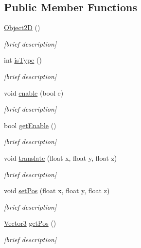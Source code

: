 \subsection*{Public Member Functions}
\begin{DoxyCompactItemize}
\item 
\hyperlink{class_object2_d_adf886706d2a5aac31e1fbe0d71e8dc82}{Object2\-D} ()
\begin{DoxyCompactList}\small\item\em \mbox{[}brief description\mbox{]} \end{DoxyCompactList}\item 
int \hyperlink{class_object2_d_abeb56d59b3bd118d9ba5f098bae0c763}{is\-Type} ()
\begin{DoxyCompactList}\small\item\em \mbox{[}brief description\mbox{]} \end{DoxyCompactList}\item 
void \hyperlink{class_object2_d_a5a2f5ce24ca8a271932fbdb86bc8aa8e}{enable} (bool e)
\begin{DoxyCompactList}\small\item\em \mbox{[}brief description\mbox{]} \end{DoxyCompactList}\item 
bool \hyperlink{class_object2_d_a8a36288b9032a3ae53cac87e37c66716}{get\-Enable} ()
\begin{DoxyCompactList}\small\item\em \mbox{[}brief description\mbox{]} \end{DoxyCompactList}\item 
void \hyperlink{class_object2_d_a2d47915dce9714aecbc03038ff408df7}{translate} (float x, float y, float z)
\begin{DoxyCompactList}\small\item\em \mbox{[}brief description\mbox{]} \end{DoxyCompactList}\item 
void \hyperlink{class_object2_d_ab07a1bb40355a3f4c0a46357aa51a132}{set\-Pos} (float x, float y, float z)
\begin{DoxyCompactList}\small\item\em \mbox{[}brief description\mbox{]} \end{DoxyCompactList}\item 
\hyperlink{struct_vector3}{Vector3} \hyperlink{class_object2_d_a4d74800b53451bfa94d89f4dfba3d00a}{get\-Pos} ()
\begin{DoxyCompactList}\small\item\em \mbox{[}brief description\mbox{]} \end{DoxyCompactList}\item 

\end{DoxyCompactItemize}

